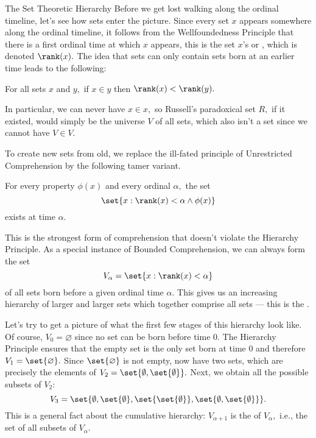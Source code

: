 \begin{unit}{The Set Theoretic Hierarchy}
Before we get lost walking along the ordinal timeline, let's see how sets enter the picture.
Since every set \(x\) appears somewhere along the ordinal timeline, it follows from the Wellfoundedness Principle that there is a first ordinal time at which \(x\) appears, this is the set \(x\)'s  or , which is denoted \(\rank(x).\)
The idea that sets can only contain sets born at an earlier time leads to the following:

\begin{hierarchyprinciple}
  For all sets \(x\) and \(y,\) if \(x \in y\) then \(\rank(x) < \rank(y).\)
\end{hierarchyprinciple}

\noindent
In particular, we can never have \(x \in x,\) so Russell's paradoxical set \(R,\) if it existed, would simply be the universe \(V\) of all sets, which also isn't a set since we cannot have \(V \in V.\)

To create new sets from old, we replace the ill-fated principle of Unrestricted Comprehension by the following tamer variant.

\begin{boundedcomprehension}
  For every property \(\phi(x)\) and every ordinal \(\alpha,\) the set \[\set{x : \rank(x) < \alpha \land \phi(x)}\] exists at time \(\alpha.\)
\end{boundedcomprehension}

\noindent
This is the strongest form of comprehension that doesn't violate the Hierarchy Principle.
As a special instance of Bounded Comprehension, we can always form the set \[V_\alpha = \set{x : \rank(x)<\alpha}\] of all sets born before a given ordinal time \(\alpha.\)
This gives us an increasing hierarchy of larger and larger sets which together comprise all sets --- this is the .

Let's try to get a picture of what the first few stages of this hierarchy look like.
Of course, \(V_0 = \varnothing\) since no set can be born before time \(0.\)
The Hierarchy Principle ensures that the empty set is the only set born at time \(0\) and therefore \(V_1 = \set{\varnothing}.\)
Since \(\set{\varnothing}\) is not empty, now have two sets, which are precisely the elements of \(V_2 = \set{\emptyset,\set{\emptyset}}.\)
Next, we obtain all the possible subsets of \(V_2\): 
\[V_3 = \set{\emptyset,\set{\emptyset},\set{\set{\emptyset}},\set{\emptyset,\set{\emptyset}}}.\]
This is a general fact about the cumulative hierarchy: \(V_{\alpha+1}\) is the  of \(V_\alpha,\) i.e., the set of all subsets of \(V_\alpha.\)


\end{unit}
